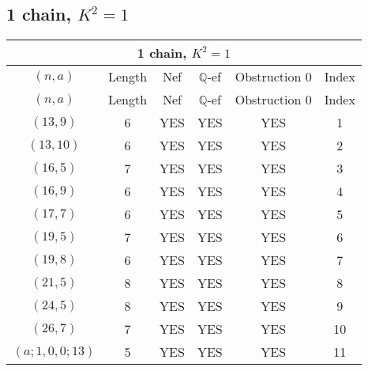\subsection{1 chain, $K^2 = 1$}
\begin{longtable}{|c|c|c|c|c|c|}
\hline
\multicolumn{6}{|c|}{1 chain, $K^2 = 1$}\\
\hline
$(n,a)$ & Length & Nef & $\mathbb Q$-ef & Obstruction 0 & Index\\
\hline
\endfirsthead

\hline
$(n,a)$ & Length & Nef & $\mathbb Q$-ef & Obstruction 0 & Index\\
\hline
\endhead
\hline
\endfoot

$(13, 9)$ & 6 & YES & YES & YES & 1\\
$(13, 10)$ & 6 & YES & YES & YES & 2\\
$(16, 5)$ & 7 & YES & YES & YES & 3\\
$(16, 9)$ & 6 & YES & YES & YES & 4\\
$(17, 7)$ & 6 & YES & YES & YES & 5\\
$(19, 5)$ & 7 & YES & YES & YES & 6\\
$(19, 8)$ & 6 & YES & YES & YES & 7\\
$(21, 5)$ & 8 & YES & YES & YES & 8\\
$(24, 5)$ & 8 & YES & YES & YES & 9\\
$(26, 7)$ & 7 & YES & YES & YES & 10\\
$(a; 1, 0, 0; 13)$ & 5 & YES & YES & YES & 11
\end{longtable}
